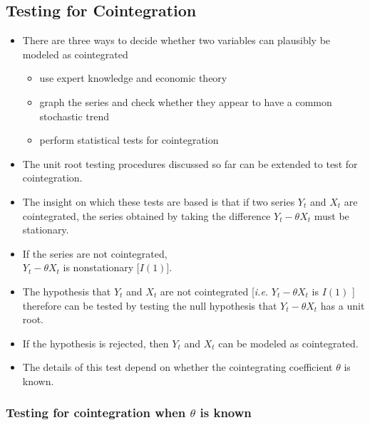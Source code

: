 \documentclass[]{book}
\providecommand{\tightlist}{%
  \setlength{\itemsep}{0pt}\setlength{\parskip}{0pt}}
\begin{document}
\hypertarget{testing-for-cointegration}{%
\subsection{Testing for Cointegration}\label{testing-for-cointegration}}

\begin{itemize}
\tightlist
\item
  There are three ways to decide whether two variables can plausibly be modeled as cointegrated

  \begin{itemize}
  \tightlist
  \item
    use expert knowledge and economic theory
  \item
    graph the series and check whether they appear to have a common stochastic trend
  \item
    perform statistical tests for cointegration
  \end{itemize}
\item
  The unit root testing procedures discussed so far can be extended to test for cointegration.
\item
  The insight on which these tests are based is that if two series \(Y_t\) and \(X_t\) are cointegrated, the series obtained by taking the difference \(Y_t-\theta X_t\) must be stationary.
\item
  If the series are not cointegrated,\\
  \(Y_t-\theta X_t\) is nonstationary {[}\(I(1)\){]}.
\item
  The hypothesis that \(Y_t\) and \(X_t\) are not cointegrated {[}\emph{i.e.} \(Y_t-\theta X_t\) is \(I(1)\) {]} therefore can be tested by testing the null hypothesis that \(Y_t-\theta X_t\) has a unit root.
\item
  If the hypothesis is rejected, then \(Y_t\) and \(X_t\) can be modeled as cointegrated.
\item
  The details of this test depend on whether the cointegrating coefficient \(\theta\) is known.
\end{itemize}

\hypertarget{testing-for-cointegration-when-theta-is-known}{%
\subsubsection{\texorpdfstring{Testing for cointegration when \(\theta\) is known}{Testing for cointegration when \textbackslash{}theta is known}}\label{testing-for-cointegration-when-theta-is-known}}
\end{document}
